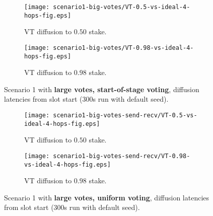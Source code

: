 \documentclass[11pt,a4paper]{article}
\begin{document}
\begin{figure}[htbp]
    \centering
    \begin{subfigure}[b]{0.45\textwidth}
        \centering
        \texttt{[image: scenario1-big-votes/VT-0.5-vs-ideal-4-hops-fig.eps]}
        \caption{VT diffusion to $0.50$ stake.}
        \label{scenario1-big-votes:vt0.5}
    \end{subfigure}
    \hfill
    \begin{subfigure}[b]{0.45\textwidth}
        \centering
        \texttt{[image: scenario1-big-votes/VT-0.98-vs-ideal-4-hops-fig.eps]}
        \caption{VT diffusion to $0.98$ stake.}
        \label{scenario1-big-votes:vt0.98}
    \end{subfigure}
    \caption{Scenario 1 with \textbf{large votes, start-of-stage voting}, diffusion latencies from slot start (300s run with default seed).}
    \label{fig:scenario1-big-votes}
\end{figure}
\begin{figure}[htbp]
    \centering
    \begin{subfigure}[b]{0.45\textwidth}
        \centering
        \texttt{[image: scenario1-big-votes-send-recv/VT-0.5-vs-ideal-4-hops-fig.eps]}
        \caption{VT diffusion to $0.50$ stake.}
        \label{scenario1-big-votes-send-recv:vt0.5}
    \end{subfigure}
    \hfill
    \begin{subfigure}[b]{0.45\textwidth}
        \centering
        \texttt{[image: scenario1-big-votes-send-recv/VT-0.98-vs-ideal-4-hops-fig.eps]}
        \caption{VT diffusion to $0.98$ stake.}
        \label{scenario1-big-votes-send-recv:vt0.98}
    \end{subfigure}
    \caption{Scenario 1 with \textbf{large votes, uniform voting}, diffusion latencies from slot start (300s run with default seed).}
    \label{fig:scenario1-big-votes-send-recv}
\end{figure}



\end{document}
